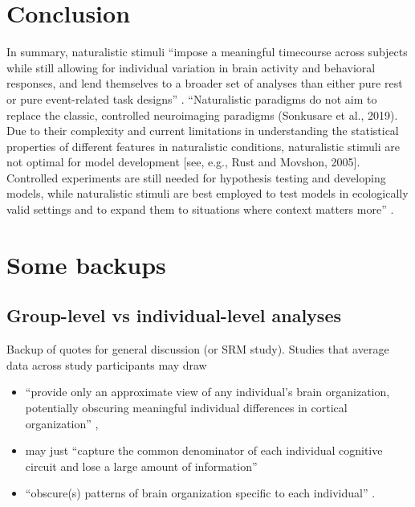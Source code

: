 \section{Conclusion}

%
In summary, naturalistic stimuli ``impose a meaningful timecourse across
subjects while still allowing for individual variation in brain activity and
behavioral responses, and lend themselves to a broader set of analyses than
either pure rest or pure event-related task designs'' \citep{finn2017can}.
%
``Naturalistic paradigms do not aim to replace the classic, controlled
neuroimaging paradigms (Sonkusare et al., 2019). Due to their complexity and
current limitations in understanding the statistical properties of different
features in naturalistic conditions, naturalistic stimuli are not optimal for
model development [see, e.g., Rust and Movshon, 2005]. Controlled experiments
are still needed for hypothesis testing and developing models, while
naturalistic stimuli are best employed to test models in ecologically valid
settings and to expand them to situations where context matters
more'' \citep{saarimaki2021naturalistic}.




\section{Some backups}


\subsection{Group-level vs individual-level analyses}

Backup of quotes for general discussion (or SRM study).  Studies that average
data across study participants may draw

\begin{itemize}

\item ``provide only an approximate view of any individual's brain organization,
    potentially obscuring meaningful individual differences in cortical
        organization'' \citep{laumann2015functional},

\item may just ``capture the common denominator of each individual cognitive
    circuit and lose a large amount of information''

\item ``obscure(s) patterns of brain organization specific to each individual''
    \citep{laumann2015functional}.

\end{itemize}


